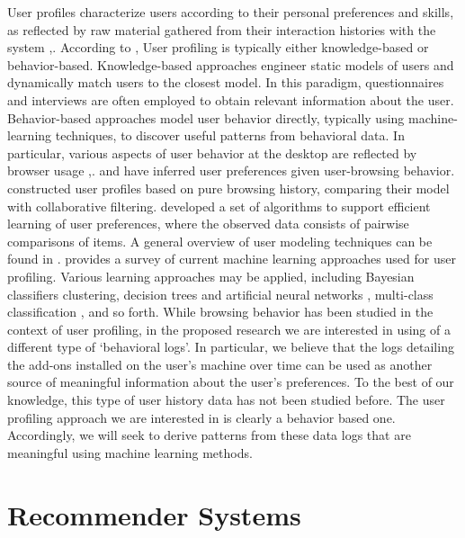 \documentclass[11pt,oneside]{book}
\let\Oldsection\section
\renewcommand{\section}{\FloatBarrier\Oldsection}
\begin{document}
User profiles characterize users according to their personal
preferences and skills, as reflected by raw material gathered from
their interaction histories with the system \citep{koch2001software},\citep{gauch2007user}. According to \citep{gauch2007user}, User profiling is typically either knowledge-based or
behavior-based. Knowledge-based approaches engineer static models of
users and dynamically match users to the closest model. In this
paradigm, questionnaires and interviews are often employed to obtain
relevant information about the user. Behavior-based approaches model
user behavior directly, typically using machine-learning techniques,
to discover useful patterns from behavioral data. In particular,
various aspects of user behavior at the desktop are reflected by
browser usage \citep{benevenuto2009characterizing},\citep{bilenko11}. \citep{lieberman1995letizia} and \citep{joachims97} have inferred user preferences given user-browsing behavior. \citep{sugiyama2004adaptive} constructed user profiles based on pure browsing history,
comparing their model with collaborative filtering.  \citep{lu2011learning} developed a set of algorithms to support efficient
learning of user preferences, where the observed data consists of
pairwise comparisons of items.  A general overview of user modeling
techniques can be found in \citep{leontiadis2012don}. \citep{sebastiani02} provides a survey of current machine learning
approaches used for user profiling.  Various learning approaches may
be applied, including Bayesian classifiers clustering, decision trees
and artificial neural networks \citep{pazzani97}, multi-class classification \cite{bauer2014analyzing},
and so forth.  While browsing behavior has been studied in the context
of user profiling, in the proposed research we are interested in using
of a different type of `behavioral logs'. In particular, we believe
that the logs detailing the add-ons installed on the user's machine
over time can be used as another source of meaningful information
about the user's preferences. To the best of our knowledge, this type
of user history data has not been studied before. The user profiling
approach we are interested in is clearly a behavior based
one. Accordingly, we will seek to derive patterns from these data logs
that are meaningful using machine learning methods.

\section{Recommender Systems}
\label{sec:recommender_systems}
\end{document}
